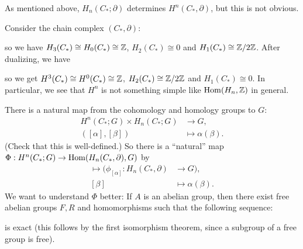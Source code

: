 \begin{remark}
  As mentioned above, $H_n(C_*; \partial)$
  determines $H^n(C_*, \partial)$, but this is not
  obvious.
\end{remark}

\begin{example}
  Consider the chain complex $(C_*, \partial)$:
  \begin{center}
  \end{center}
  so we have $H_3(C_*) \cong H_0(C_*) \cong \mathbb{Z}$,
  $H_2(C_*) \cong 0$ and $H_1(C_*) \cong \mathbb{Z} / 2\mathbb{Z}$.
  After dualizing, we have
  \begin{center}
  \end{center}
  so we get
  $H^3(C_*) \cong H^0(C_*) \cong \mathbb{Z}$,
  $H_2(C_*) \cong \mathbb{Z} / 2\mathbb{Z}$ and $H_1(C_*) \cong 0$.
  In particular, we see that
  $H^n$ is not something simple
  like $\operatorname{Hom}(H_n, \mathbb{Z})$ in general.
\end{example}

\begin{remark}
  There is a natural map from the cohomology and
  homology groups to $G$:
  \begin{align*}
    H^n(C_*; G) \times H_n(C_*; G) &\longrightarrow G, \\
    ([\alpha], [\beta]) &\longmapsto \alpha(\beta).
  \end{align*}
  (Check that this is well-defined.)
  So there is a ``natural'' map $\Phi : H^n(C_*; G) \to \operatorname{Hom}(H_n(C_*, \partial), G)$ by
  \begin{align*}
    [\alpha] \longmapsto (\phi_{[\alpha]} : H_n(C_*, \partial) &\longrightarrow G), \\
    [\beta] &\longmapsto \alpha(\beta).
  \end{align*}
  We want to understand $\Phi$ better: If
  $A$ is an abelian group, then there exist free
  abelian groups $F, R$ and homomorphisms such that
  the following sequence:
  \begin{center}
  \end{center}
  is exact (this follows by the first isomorphism
  theorem, since a subgroup of a free group is
  free).
\end{remark}

